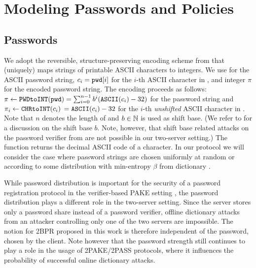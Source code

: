\section{Modeling Passwords and Policies}

\subsection{Passwords}
We adopt the reversible, structure-preserving encoding scheme from \cite{KieferM14c} that (uniquely) maps strings of printable ASCII characters to integers.
We use \pwd for the ASCII password string, $c_i=\mathtt{pwd}[i]$ for the $i$-th ASCII character in \pwd, and integer $\pi$ for the encoded password string.
The encoding proceeds as follows: $\pi\gets\texttt{PWDtoINT}(\mathtt{pwd})=\sum_{i=0}^{n-1}b^{i} (\mathtt{ASCII}(c_i)-32)$ for the password string \pwd and $\pi_i\gets\texttt{CHRtoINT}(c_i)$ $=\mathtt{ASCII}(c_i)-32$ for the $i$-th \emph{unshifted} ASCII character in \pwd.
Note that $n$ denotes the length of \pwd and $b\in\mathbb{N}$ is used as shift base.
(We refer to \cite{KieferM14c} for a discussion on the shift base $b$. Note, however, that shift base related attacks on the password verifier from \cite{KieferM14c} are not possible in our two-server setting.) The \ASCII function returns the decimal ASCII code of a character.
In our protocol we will consider the case where password strings \pwd are chosen uniformly at random or according to some distribution with min-entropy $\beta$ from dictionary \cD.

\begin{remark}\label{rem:passwords}
While password distribution is important for the security of a password registration protocol in the verifier-based PAKE setting \cite{KieferM14c}, the password distribution plays a different role in the two-server setting.
Since the server stores only a password share instead of a password verifier, offline dictionary attacks from an attacker controlling only one of the two servers are impossible.
The notion for 2BPR proposed in this work is therefore independent of the password, chosen by the client.
Note however that the password strength still continues to play a role in the usage of 2PAKE/2PASS protocols, where it influences the probability of successful online dictionary attacks.
\end{remark}

